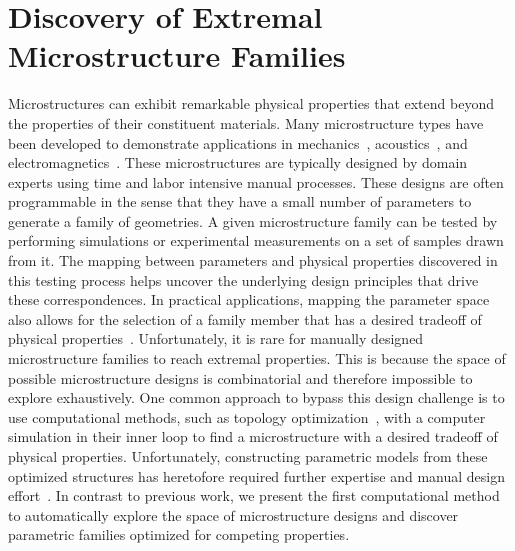 \section{Discovery of Extremal Microstructure Families}
\label{sec:discovery}
Microstructures can exhibit remarkable physical properties that extend beyond the properties of their constituent materials.
Many microstructure types have been developed to demonstrate applications
in mechanics~\citep{milton1995,kadic2012practicability,meza2014strong,zheng2014ultralight,li2016mechanical,wang2016lightweight},
acoustics~\citep{fang2006ultrasonic,li2009experimental}, 
and electromagnetics~\citep{schurig2006metamaterial,shalaev2007optical}.
These microstructures are typically designed by domain experts using time and labor intensive manual processes. These designs are often programmable in the sense that they have a small number of parameters to generate a family of geometries. A given microstructure family can be tested by performing simulations or experimental measurements on a set of samples drawn from it. The mapping between parameters and physical properties discovered in this testing process helps uncover the underlying design principles that drive these correspondences.
In practical applications, mapping the parameter space also allows for the selection of a family member that has a desired tradeoff of physical properties~\citep{gibson1982mechanics}.
Unfortunately, it is rare for manually designed microstructure families to reach extremal properties. This is because the space of possible microstructure designs is combinatorial and therefore impossible to explore exhaustively.
One common approach to bypass this design challenge is to use computational methods,
such as topology optimization~\citep{sigmund1994materials,vogiatzis2017topology}, with a computer simulation in their inner loop to find a microstructure with a desired tradeoff of physical properties.
Unfortunately, constructing parametric models from these optimized structures has heretofore required further expertise and manual design effort~\citep{clausen2015topology}.
In contrast to previous work, we present the first computational method to automatically explore the space of microstructure designs and discover parametric families optimized for competing properties.

